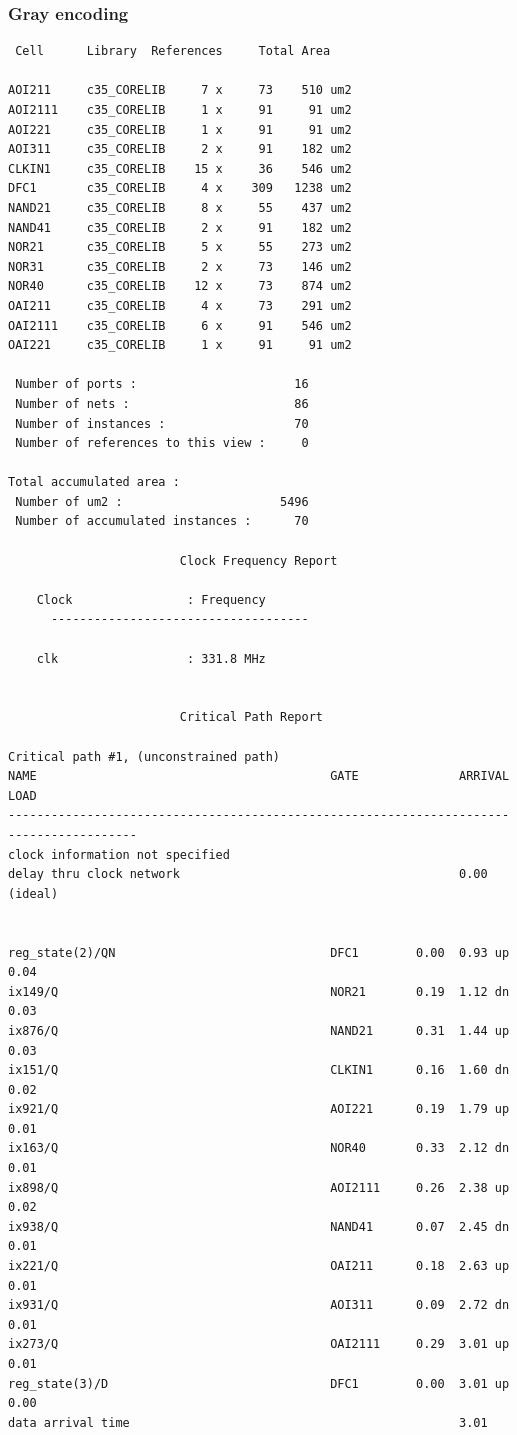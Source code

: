 \documentclass[a4paper,11pt]{article}
\begin{document}
\subsubsection{Gray encoding}
\begin{verbatim}
 Cell      Library  References     Total Area

AOI211     c35_CORELIB     7 x     73    510 um2
AOI2111    c35_CORELIB     1 x     91     91 um2
AOI221     c35_CORELIB     1 x     91     91 um2
AOI311     c35_CORELIB     2 x     91    182 um2
CLKIN1     c35_CORELIB    15 x     36    546 um2
DFC1       c35_CORELIB     4 x    309   1238 um2
NAND21     c35_CORELIB     8 x     55    437 um2
NAND41     c35_CORELIB     2 x     91    182 um2
NOR21      c35_CORELIB     5 x     55    273 um2
NOR31      c35_CORELIB     2 x     73    146 um2
NOR40      c35_CORELIB    12 x     73    874 um2
OAI211     c35_CORELIB     4 x     73    291 um2
OAI2111    c35_CORELIB     6 x     91    546 um2
OAI221     c35_CORELIB     1 x     91     91 um2

 Number of ports :                      16
 Number of nets :                       86
 Number of instances :                  70
 Number of references to this view :     0

Total accumulated area : 
 Number of um2 :                      5496
 Number of accumulated instances :      70

                        Clock Frequency Report

	Clock                : Frequency
      ------------------------------------

	clk                  : 331.8 MHz


                        Critical Path Report

Critical path #1, (unconstrained path)
NAME                                         GATE              ARRIVAL              LOAD
----------------------------------------------------------------------------------------
clock information not specified
delay thru clock network                                       0.00 (ideal)


reg_state(2)/QN                              DFC1        0.00  0.93 up             0.04
ix149/Q                                      NOR21       0.19  1.12 dn             0.03
ix876/Q                                      NAND21      0.31  1.44 up             0.03
ix151/Q                                      CLKIN1      0.16  1.60 dn             0.02
ix921/Q                                      AOI221      0.19  1.79 up             0.01
ix163/Q                                      NOR40       0.33  2.12 dn             0.01
ix898/Q                                      AOI2111     0.26  2.38 up             0.02
ix938/Q                                      NAND41      0.07  2.45 dn             0.01
ix221/Q                                      OAI211      0.18  2.63 up             0.01
ix931/Q                                      AOI311      0.09  2.72 dn             0.01
ix273/Q                                      OAI2111     0.29  3.01 up             0.01
reg_state(3)/D                               DFC1        0.00  3.01 up             0.00
data arrival time                                              3.01



\end{verbatim}
\end{document}
